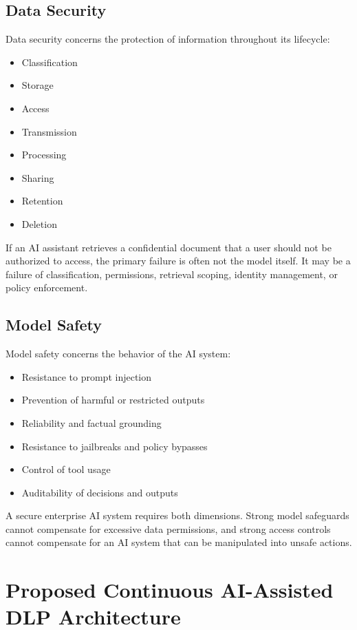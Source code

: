 \documentclass[conference]{IEEEtran}
\begin{document}
\subsection{Data Security}

Data security concerns the protection of information throughout its lifecycle:

\begin{itemize}
  \item Classification
  \item Storage
  \item Access
  \item Transmission
  \item Processing
  \item Sharing
  \item Retention
  \item Deletion
\end{itemize}

If an AI assistant retrieves a confidential document that a user should not be authorized to access, the primary failure is often not the model itself. It may be a failure of classification, permissions, retrieval scoping, identity management, or policy enforcement.

\subsection{Model Safety}

Model safety concerns the behavior of the AI system:

\begin{itemize}
  \item Resistance to prompt injection
  \item Prevention of harmful or restricted outputs
  \item Reliability and factual grounding
  \item Resistance to jailbreaks and policy bypasses
  \item Control of tool usage
  \item Auditability of decisions and outputs
\end{itemize}

A secure enterprise AI system requires both dimensions. Strong model safeguards cannot compensate for excessive data permissions, and strong access controls cannot compensate for an AI system that can be manipulated into unsafe actions.

\section{Proposed Continuous AI-Assisted DLP Architecture}
\end{document}
